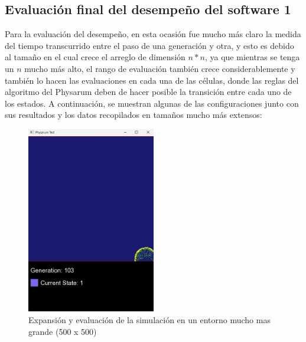 \subsection{Evaluaci\'on final del desempe\~no del software 1}
    Para la evaluaci\'on del desempe\~no, en esta ocasi\'on fue
        mucho m\'as claro la medida del tiempo transcurrido entre el
        paso de una generaci\'on y otra, y esto es debido al tama\~no en
        el cual crece el arreglo de dimensi\'on $n * n$, ya que mientras
        se tenga un $n$ mucho m\'as alto, el rango de evaluaci\'on
        tambi\'en crece considerablemente y tambi\'en lo hacen las
        evaluaciones en cada una de las c\'elulas, donde las reglas del
        algoritmo del Physarum deben de hacer posible la transici\'on
        entre cada uno de los estados.
    \vskip 0.5cm
    A continuaci\'on, se muestran algunas de las configuraciones
    junto con sus resultados y los datos recopilados en tama\~nos
    mucho m\'as extensos:
    \vskip 0.5cm
    \begin{figure}[htbp]
        \centering
        \includegraphics[width=0.5\textwidth]{./images/Pruebas/simulador/image079.png}
        \caption{Expansi\'on y evaluaci\'on de la simulaci\'on en un entorno mucho mas grande (500 x 500)}
        \label{fig:Ruta 79}
    \end{figure}
    \vskip 0.5cm
